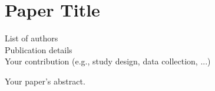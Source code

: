 \chapter[Paper's short title]{Paper Title}
\label{papers:icse19}

\begin{paperdetails}
List of authors\\
Publication details\\
Your contribution (e.g., study design, data collection, ...)
\end{paperdetails}

\begin{paperabstract}
Your paper's abstract.
\end{paperabstract}


%
%
